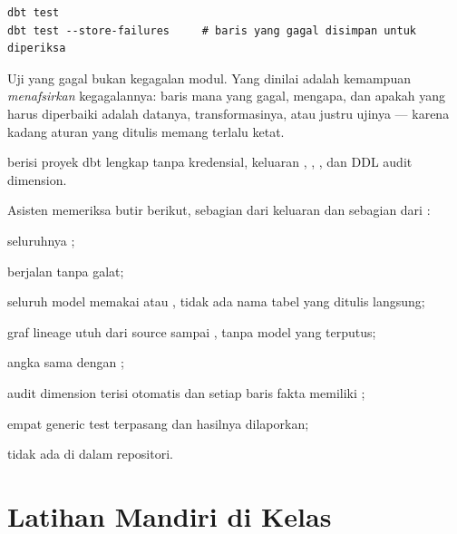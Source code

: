 \begin{lstlisting}[style=shellgaya]
dbt test
dbt test --store-failures     # baris yang gagal disimpan untuk diperiksa
\end{lstlisting}

\begin{catatan}
Uji yang gagal bukan kegagalan modul. Yang dinilai adalah kemampuan
\emph{menafsirkan} kegagalannya: baris mana yang gagal, mengapa, dan apakah
yang harus diperbaiki adalah datanya, transformasinya, atau justru ujinya ---
karena kadang aturan yang ditulis memang terlalu ketat.
\end{catatan}

\begin{luaran}
 berisi proyek dbt lengkap tanpa kredensial, keluaran
, , , dan
DDL audit dimension.
\end{luaran}

\begin{checkpoint}
Asisten memeriksa butir berikut, sebagian dari keluaran  dan
sebagian dari :
\begin{ceklis}
  \item {} seluruhnya ;
  \item {} berjalan tanpa galat;
  \item seluruh model memakai  atau , tidak ada
        nama tabel yang ditulis langsung;
  \item graf lineage utuh dari source sampai , tanpa
        model yang terputus;
  \item angka  sama dengan
        ;
  \item audit dimension terisi otomatis dan setiap baris fakta memiliki
        ;
  \item empat generic test terpasang dan hasilnya dilaporkan;
  \item {} tidak ada di dalam repositori.
\end{ceklis}
\end{checkpoint}

\section{Latihan Mandiri di Kelas}

